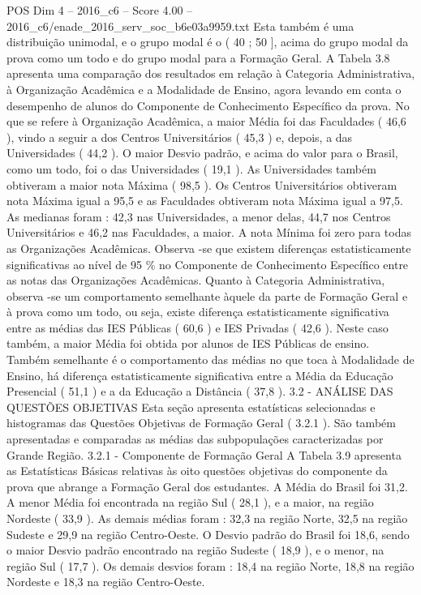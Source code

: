 \begin{textsample}{POS Dim 4 – 2016\_c6 – Score 4.00 – 2016\_c6/enade\_2016\_serv\_soc\_b6e03a9959.txt}
Esta também é uma distribuição unimodal, e o grupo modal é o ( 40 ; 50 ], acima do grupo modal da prova como um todo e do grupo modal para a Formação Geral.
A Tabela 3.8 apresenta uma comparação dos resultados em relação à Categoria Administrativa, à Organização Acadêmica e a Modalidade de Ensino, agora levando em conta o desempenho de alunos do Componente de Conhecimento Específico da prova.
No que se refere à Organização Acadêmica, a maior Média foi das Faculdades ( 46,6 ), vindo a seguir a dos Centros Universitários ( 45,3 ) e, depois, a das Universidades ( 44,2 ).
O maior Desvio padrão, e acima do valor para o Brasil, como um todo, foi o das Universidades ( 19,1 ).
As Universidades também obtiveram a maior nota Máxima ( 98,5 ).
Os Centros Universitários obtiveram nota Máxima igual a 95,5 e as Faculdades obtiveram nota Máxima igual a 97,5.
As medianas foram : 42,3 nas Universidades, a menor delas, 44,7 nos Centros Universitários e 46,2 nas Faculdades, a maior.
A nota Mínima foi zero para todas as Organizações Acadêmicas.
Observa -se que existem diferenças estatisticamente significativas ao nível de 95 \% no Componente de Conhecimento Específico entre as notas das Organizações Acadêmicas.
Quanto à Categoria Administrativa, observa -se um comportamento semelhante àquele da parte de Formação Geral e à prova como um todo, ou seja, existe diferença estatisticamente significativa entre as médias das IES Públicas ( 60,6 ) e IES Privadas ( 42,6 ).
Neste caso também, a maior Média foi obtida por alunos de IES Públicas de ensino.
Também semelhante é o comportamento das médias no que toca à Modalidade de Ensino, há diferença estatisticamente significativa entre a Média da Educação Presencial ( 51,1 ) e a da Educação a Distância ( 37,8 ). 3.2 - ANÁLISE DAS QUESTÕES OBJETIVAS Esta seção apresenta estatísticas selecionadas e histogramas das Questões Objetivas de Formação Geral ( 3.2.1 ).
São também apresentadas e comparadas as médias das subpopulações caracterizadas por Grande Região. 3.2.1 - Componente de Formação Geral A Tabela 3.9 apresenta as Estatísticas Básicas relativas às oito questões objetivas do componente da prova que abrange a Formação Geral dos estudantes.
A Média do Brasil foi 31,2.
A menor Média foi encontrada na região Sul ( 28,1 ), e a maior, na região Nordeste ( 33,9 ).
As demais médias foram : 32,3 na região Norte, 32,5 na região Sudeste e 29,9 na região Centro-Oeste.
O Desvio padrão do Brasil foi 18,6, sendo o maior Desvio padrão encontrado na região Sudeste ( 18,9 ), e o menor, na região Sul ( 17,7 ).
Os demais desvios foram : 18,4 na região Norte, 18,8 na região Nordeste e 18,3 na região Centro-Oeste.

\end{textsample}
